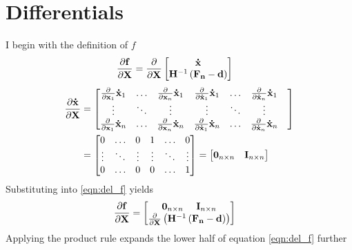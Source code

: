 \chapter{Differentials}
\noindent I begin with the definition of $f$
\begin{align} \label{eqn:del_f}
    \frac{\partial\mathbf{f}}{\partial \mathbf{X}} &= \frac{\partial}{\partial \mathbf{X}}
    \begin{bmatrix}
    {\mathbf{\dot{x}}} \\
    {\mathbf{H}}^{-1}\left ({\mathbf{F_n}} - {\mathbf{d}} \right )
    \end{bmatrix} 
\end{align}
\begin{align*}
    \frac{\partial{\mathbf{\dot{x}}}}{\partial \mathbf{X}}  &= 
    \begin{bmatrix}
    \frac{\partial}{\partial {\mathbf{{x}}}_1}{\mathbf{\dot{x}}}_1 &  \hdots & \frac{\partial}{\partial {\mathbf{{x}}}_n}{\mathbf{\dot{x}}}_1 & \frac{\partial}{\partial {\mathbf{\dot{x}}}_1}{\mathbf{\dot{x}}}_1 & \hdots & \frac{\partial}{\partial {\mathbf{\dot{x}}}_n}{\mathbf{\dot{x}}}_1\\
    \vdots & \ddots & \vdots & \vdots & \ddots & \vdots  & \\
    \frac{\partial}{\partial {\mathbf{{x}}}_1}{\mathbf{\dot{x}}}_n & \hdots & \frac{\partial}{\partial {\mathbf{{x}}}_n}{\mathbf{\dot{x}}}_n  & \frac{\partial}{\partial {\mathbf{\dot{x}}}_1}{\mathbf{\dot{x}}}_n   & \hdots & \frac{\partial}{\partial {\mathbf{\dot{x}}}_n}{\mathbf{\dot{x}}}_n\\
    \end{bmatrix} \\ &=
    \begin{bmatrix}
    0 & \hdots & 0 & 1 & \hdots & 0\\
    \vdots & \ddots & \vdots & \vdots & \ddots & \vdots\\
    0 & \hdots & 0 & 0 & \hdots & 1 \\
    \end{bmatrix} = 
    \begin{bmatrix}
    {\mathbf{0}}_{n \times n} & {\mathbf{I}}_{n \times n}
    \end{bmatrix}
\end{align*}
\noindent Substituting into \ref{eqn:del_f} yields 
\begin{align} \label{del_f_2}
    \frac{\partial\mathbf{f}}{\partial\mathbf{X}} &= 
    \begin{bmatrix}
    {\mathbf{0}}_{n \times n}  ~~~~ {\mathbf{I}}_{n \times n}  \\
    \frac{\partial}{\partial \mathbf{X}} \left ({\mathbf{H}}^{-1}\left ({\mathbf{F_n}} - {\mathbf{d}} \right ) \right ) 
    \end{bmatrix}
\end{align}
\noindent Applying the product rule expands the lower half of equation \ref{eqn:del_f} further
